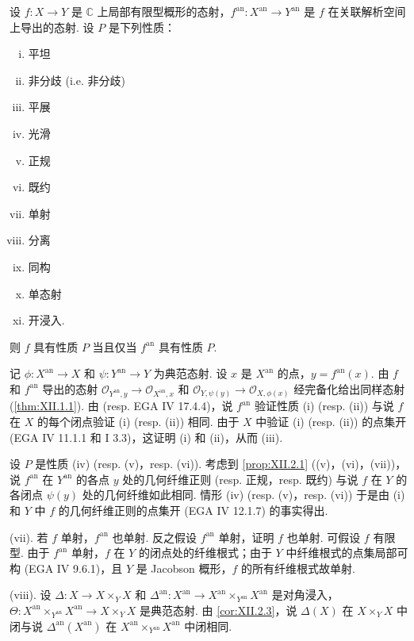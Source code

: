 \begin{proposition}\label{prop:XII.3.1}
设 $f \colon X \to Y$ 是 $\mathbb{C}$ 上局部有限型概形的态射，$f^{\mathrm{an}} \colon X^{\mathrm{an}} \to Y^{\mathrm{an}}$ 是 $f$ 在关联解析空间上导出的态射. 设 $P$ 是下列性质：
\begin{enumerate}[i)]
\item 平坦
\item[ii)] 非分歧 (i.e. 非分歧)
\item[iii)] 平展
\item[iv)] 光滑
\item[v)] 正规
\item[vi)] 既约
\item[vii)] 单射
\item[viii)] 分离
\item[ix)] 同构
\item[x)] 单态射
\item[xi)] 开浸入.
\end{enumerate}
则 $f$ 具有性质 $P$ 当且仅当 $f^{\mathrm{an}}$ 具有性质 $P$.
\end{proposition}

记 $\phi \colon X^{\mathrm{an}} \to X$ 和 $\psi \colon Y^{\mathrm{an}} \to Y$ 为典范态射. 设 $x$ 是 $X^{\mathrm{an}}$ 的点，$y = f^{\mathrm{an}}(x)$. 由 $f$ 和 $f^{\mathrm{an}}$ 导出的态射 $\mathcal{O}_{Y^{\mathrm{an}},y} \to \mathcal{O}_{X^{\mathrm{an}},x}$ 和 $\mathcal{O}_{Y,\psi(y)} \to \mathcal{O}_{X,\phi(x)}$ 经完备化给出同样态射 (\cref{thm:XII.1.1}). 由 \cite[第 3 章 §5 命题 4]{exp12-2} (resp. EGA IV 17.4.4)，说 $f^{\mathrm{an}}$ 验证性质 (i) (resp. (ii)) 与说 $f$ 在 $X$ 的每个闭点验证 (i) (resp. (ii)) 相同. 由于 $X$ 中验证 (i) (resp. (ii)) 的点集开 (EGA IV 11.1.1 和 I 3.3)，这证明 (i) 和 (ii)，从而 (iii).

设 $P$ 是性质 (iv) (resp. (v)，resp. (vi)). 考虑到 \ref{prop:XII.2.1} ((v)，(vi)，(vii))，说 $f^{\mathrm{an}}$ 在 $Y^{\mathrm{an}}$ 的各点 $y$ 处的几何纤维正则 (resp. 正规，resp. 既约) 与说 $f$ 在 $Y$ 的各闭点 $\psi(y)$ 处的几何纤维如此相同. 情形 (iv) (resp. (v)，resp. (vi)) 于是由 (i) 和 $Y$ 中 $f$ 的几何纤维正则的点集开 (EGA IV 12.1.7) 的事实得出.

(vii). 若 $f$ 单射，$f^{\mathrm{an}}$ 也单射. 反之假设 $f^{\mathrm{an}}$ 单射，证明 $f$ 也单射. 可假设 $f$ 有限型. 由于 $f^{\mathrm{an}}$ 单射，$f$ 在 $Y$ 的闭点处的纤维根式；由于 $Y$ 中纤维根式的点集局部可构 (EGA IV 9.6.1)，且 $Y$ 是 Jacobson 概形，$f$ 的所有纤维根式故单射.

(viii). 设 $\Delta \colon X \to X \times_Y X$ 和 $\Delta^{\mathrm{an}} \colon X^{\mathrm{an}} \to X^{\mathrm{an}} \times_{Y^{\mathrm{an}}} X^{\mathrm{an}}$ 是对角浸入，$\Theta \colon X^{\mathrm{an}} \times_{Y^{\mathrm{an}}} X^{\mathrm{an}} \to X \times_Y X$ 是典范态射. 由 \ref{cor:XII.2.3}，说 $\Delta(X)$ 在 $X \times_Y X$ 中闭与说 $\Delta^{\mathrm{an}}(X^{\mathrm{an}})$ 在 $X^{\mathrm{an}} \times_{Y^{\mathrm{an}}} X^{\mathrm{an}}$ 中闭相同.

